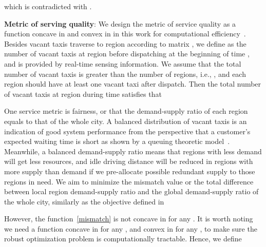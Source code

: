 \documentclass[10pt,twocolumn,twoside,english]{IEEEtran}
\begin{document}
which is contradicted with .
\fi




\textbf{Metric of serving quality}:
We design the metric of service quality as a function  concave in  and convex in  in this work for computational efficiency~\cite{robustconvex}. Besides vacant taxis traverse to region  according to matrix , we define  as the number of vacant taxis at region  before dispatching at the beginning of time , and  is provided by real-time sensing information. We assume that the total number of vacant taxis is greater than the number of regions, i.e., , and each region should have at least one vacant taxi after dispatch. Then the total number of vacant taxis at region  during time  satisfies that



One service metric is fairness, or that the demand-supply ratio of each region equals to that of the whole city. A balanced distribution of vacant taxis is an indication of good system performance from the perspective that a customer's expected waiting time is short as shown by a queuing theoretic model~\cite{mod}. Meanwhile, a balanced demand-supply ratio means that regions with less demand will get less resources, and idle driving distance will be reduced in regions with more supply than demand if we pre-allocate possible redundant supply to those regions in need. We aim to minimize the mismatch value or the total difference between local region demand-supply ratio and the global demand-supply ratio of the whole city, similarly as the objective defined in~\cite{taxi_Feiiccps15,Miao_tase16}



However, the function~\eqref{mismatch} is not concave in  for any . It is worth noting we need a function  concave in  for any , and convex in  for any , to make sure the robust optimization problem is computationally tractable. Hence, we define
\end{document}
